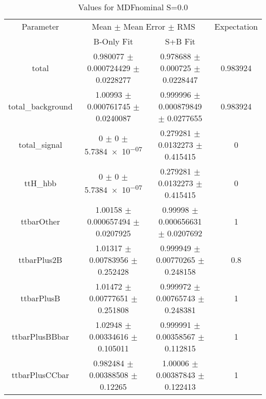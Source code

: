 \begin{table}
\centering
\caption{Values for MDFnominal S=0.0}
\begin{tabular}{cccc}
\toprule
Parameter & \multicolumn{2}{c}{Mean $\pm$ Mean Error $\pm$ RMS} & Expectation\\
 & B-Only Fit & S+B Fit & \\
\midrule
total & \num{0.980077} $\pm$ \num{0.000724429} $\pm$ \num{0.0228277} & \num{0.978688} $\pm$ \num{0.000725} $\pm$ \num{0.0228447} & \num{0.983924}\\
total\_background & \num{1.00993} $\pm$ \num{0.000761745} $\pm$ \num{0.0240087} & \num{0.999996} $\pm$ \num{0.000879849} $\pm$ \num{0.0277655} & \num{0.983924}\\
total\_signal & \num{0} $\pm$ \num{0} $\pm$ \num{5.7384e-07} & \num{0.279281} $\pm$ \num{0.0132273} $\pm$ \num{0.415415} & \num{0}\\
ttH\_hbb & \num{0} $\pm$ \num{0} $\pm$ \num{5.7384e-07} & \num{0.279281} $\pm$ \num{0.0132273} $\pm$ \num{0.415415} & \num{0}\\
ttbarOther & \num{1.00158} $\pm$ \num{0.000657494} $\pm$ \num{0.0207925} & \num{0.99998} $\pm$ \num{0.000656631} $\pm$ \num{0.0207692} & \num{1}\\
ttbarPlus2B & \num{1.01317} $\pm$ \num{0.00783956} $\pm$ \num{0.252428} & \num{0.999949} $\pm$ \num{0.00770265} $\pm$ \num{0.248158} & \num{0.8}\\
ttbarPlusB & \num{1.01472} $\pm$ \num{0.00777651} $\pm$ \num{0.251808} & \num{0.999972} $\pm$ \num{0.00765743} $\pm$ \num{0.248381} & \num{1}\\
ttbarPlusBBbar & \num{1.02948} $\pm$ \num{0.00334616} $\pm$ \num{0.105011} & \num{0.999991} $\pm$ \num{0.00358567} $\pm$ \num{0.112815} & \num{1}\\
ttbarPlusCCbar & \num{0.982484} $\pm$ \num{0.00388508} $\pm$ \num{0.12265} & \num{1.00006} $\pm$ \num{0.00387843} $\pm$ \num{0.122413} & \num{1}\\
\bottomrule
\end{tabular}
\end{table}
